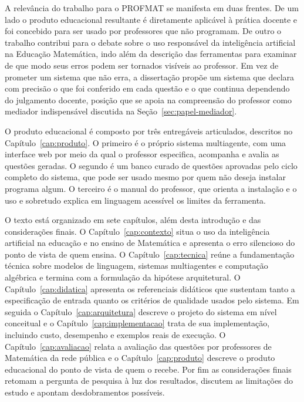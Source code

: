 A relevância do trabalho para o PROFMAT se manifesta em duas frentes. De um lado o produto
educacional resultante é diretamente aplicável à prática docente e foi concebido para ser usado
por professores que não programam. De outro o trabalho contribui para o debate sobre o uso
responsável da inteligência artificial na Educação Matemática, indo além da descrição das
ferramentas para examinar de que modo seus erros podem ser tornados visíveis ao professor. Em vez
de prometer um sistema que não erra, a dissertação propõe um sistema que declara com precisão o
que foi conferido em cada questão e o que continua dependendo do julgamento docente, posição que
se apoia na compreensão do professor como mediador indispensável discutida na
Seção~\ref{sec:papel-mediador}.

O produto educacional é composto por três entregáveis articulados, descritos no
Capítulo~\ref{cap:produto}. O primeiro é o próprio sistema multiagente, com uma interface web por
meio da qual o professor especifica, acompanha e avalia as questões geradas. O segundo é um banco
curado de questões aprovadas pelo ciclo completo do sistema, que pode ser usado mesmo por quem
não deseja instalar programa algum. O terceiro é o manual do professor, que orienta a instalação e
o uso e sobretudo explica em linguagem acessível os limites da ferramenta.

O texto está organizado em sete capítulos, além desta introdução e das considerações finais. O
Capítulo~\ref{cap:contexto} situa o uso da inteligência artificial na educação e no ensino de
Matemática e apresenta o erro silencioso do ponto de vista de quem ensina. O
Capítulo~\ref{cap:tecnica} reúne a fundamentação técnica sobre modelos de linguagem, sistemas
multiagentes e computação algébrica e termina com a formulação da hipótese arquitetural. O
Capítulo~\ref{cap:didatica} apresenta os referenciais didáticos que sustentam tanto a especificação
de entrada quanto os critérios de qualidade usados pelo sistema. Em seguida o
Capítulo~\ref{cap:arquitetura} descreve o projeto do sistema em nível conceitual e o
Capítulo~\ref{cap:implementacao} trata de sua implementação, incluindo custo, desempenho e
exemplos reais de execução. O Capítulo~\ref{cap:avaliacao} relata a avaliação das questões por
professores de Matemática da rede pública e o Capítulo~\ref{cap:produto} descreve o produto
educacional do ponto de vista de quem o recebe. Por fim as considerações finais retomam a pergunta
de pesquisa à luz dos resultados, discutem as limitações do estudo e apontam desdobramentos
possíveis.
